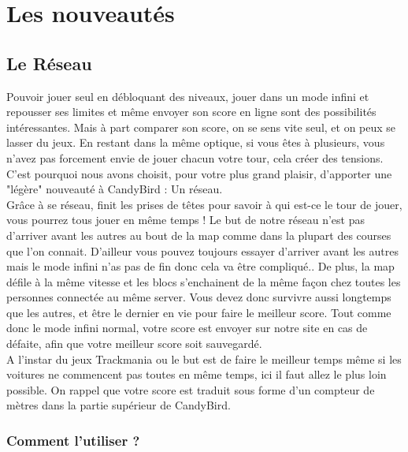 \documentclass [11pt]{report}
\begin{document}
		
		\vspace{10mm}
		
		
\chapter{Les nouveautés}
	\section{Le Réseau}
		Pouvoir jouer seul en débloquant des niveaux, jouer dans un mode infini et repousser ses limites et même envoyer son score en ligne sont des possibilités intéressantes. Mais à part comparer son score, on se sens vite seul, et on peux se lasser du jeux. En restant dans la même optique, si vous êtes à plusieurs, vous n'avez pas forcement envie de jouer chacun votre tour, cela créer des tensions.\\
		
		C'est pourquoi nous avons choisit, pour votre plus grand plaisir, d'apporter une "légère" nouveauté à CandyBird : Un réseau.\\
		
		Grâce à se réseau, finit les prises de têtes pour savoir à qui est-ce le tour de jouer, vous pourrez tous jouer en même temps !
		Le but de notre réseau n'est pas d'arriver avant les autres au bout de la map comme dans la plupart des courses que l'on connait. D'ailleur vous pouvez toujours essayer d'arriver avant les autres mais le mode infini n'as pas de fin donc cela va être compliqué.. De plus, la map défile à la même vitesse et les blocs s'enchainent de la même façon chez toutes les personnes connectée au même server. Vous devez donc survivre aussi longtemps que les autres, et être le dernier en vie pour faire le meilleur score. Tout comme donc le mode infini normal, votre score est envoyer sur notre site en cas de défaite, afin que votre meilleur score soit sauvegardé.\\
		
		A l'instar du jeux Trackmania ou le but est de faire le meilleur temps même si les voitures ne commencent pas toutes en même temps, ici il faut allez le plus loin possible. On rappel que votre score est traduit sous forme d'un compteur de mètres dans la partie supérieur de CandyBird.
		
		\newpage
		
		\subsection{Comment l'utiliser ?}
		
\end{document}
